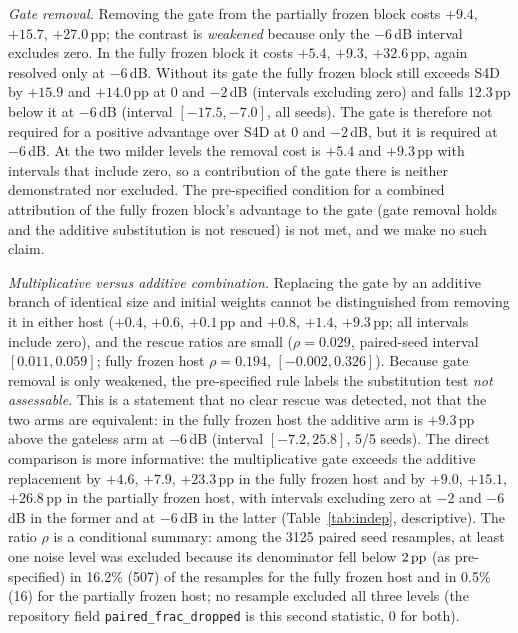 \emph{Gate removal.} Removing the gate from the partially frozen block costs $+9.4$, $+15.7$, $+27.0$\,pp; the contrast is \emph{weakened} because only the $-6$\,dB interval excludes zero. In the fully frozen block it costs $+5.4$, $+9.3$, $+32.6$\,pp, again resolved only at $-6$\,dB. Without its gate the fully frozen block still exceeds S4D by $+15.9$ and $+14.0$\,pp at $0$ and $-2$\,dB (intervals excluding zero) and falls 12.3\,pp below it at $-6$\,dB (interval $[-17.5, -7.0]$, all seeds). The gate is therefore not required for a positive advantage over S4D at $0$ and $-2$\,dB, but it is required at $-6$\,dB. At the two milder levels the removal cost is $+5.4$ and $+9.3$\,pp with intervals that include zero, so a contribution of the gate there is neither demonstrated nor excluded. The pre-specified condition for a combined attribution of the fully frozen block's advantage to the gate (gate removal holds and the additive substitution is not rescued) is not met, and we make no such claim.

\emph{Multiplicative versus additive combination.} Replacing the gate by an additive branch of identical size and initial weights cannot be distinguished from removing it in either host ($+0.4$, $+0.6$, $+0.1$\,pp and $+0.8$, $+1.4$, $+9.3$\,pp; all intervals include zero), and the rescue ratios are small ($\rho = 0.029$, paired-seed interval $[0.011, 0.059]$; fully frozen host $\rho = 0.194$, $[-0.002, 0.326]$). Because gate removal is only weakened, the pre-specified rule labels the substitution test \emph{not assessable}. This is a statement that no clear rescue was detected, not that the two arms are equivalent: in the fully frozen host the additive arm is $+9.3$\,pp above the gateless arm at $-6$\,dB (interval $[-7.2, 25.8]$, 5/5 seeds). The direct comparison is more informative: the multiplicative gate exceeds the additive replacement by $+4.6$, $+7.9$, $+23.3$\,pp in the fully frozen host and by $+9.0$, $+15.1$, $+26.8$\,pp in the partially frozen host, with intervals excluding zero at $-2$ and $-6$\,dB in the former and at $-6$\,dB in the latter (Table~\ref{tab:indep}, descriptive). The ratio $\rho$ is a conditional summary: among the 3125 paired seed resamples, at least one noise level was excluded because its denominator fell below $2\,\mathrm{pp}$ (as pre-specified) in 16.2\% (507) of the resamples for the fully frozen host and in 0.5\% (16) for the partially frozen host; no resample excluded all three levels (the repository field \texttt{paired\_frac\_dropped} is this second statistic, $0$ for both).

